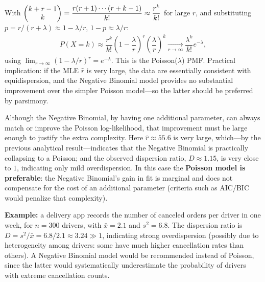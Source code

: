 \begin{solproblema}[prob:8fd9d7f]
	With $\begin{pmatrix} k+r-1 \\ k\end{pmatrix} = \dfrac{r(r+1)\cdots(r+k-1)}{k!} \approx \dfrac{r^k}{k!}$ for large $r$, and substituting $p=r/(r+\lambda)\approx1-\lambda/r$, $1-p\approx\lambda/r$:
	\begin{align*}
		P(X=k) \approx \dfrac{r^k}{k!}\left(1-\dfrac{\lambda}{r}\right)^r\left(\dfrac{\lambda}{r}\right)^k \xrightarrow[r\to\infty]{} \dfrac{\lambda^k}{k!}e^{-\lambda},
	\end{align*}
	using $\lim_{r\to\infty}(1-\lambda/r)^r=e^{-\lambda}$. This is the Poisson($\lambda$) PMF. Practical implication: if the MLE $\hat{r}$ is very large, the data are essentially consistent with equidispersion, and the Negative Binomial model provides no substantial improvement over the simpler Poisson model---so the latter should be preferred by parsimony.
\end{solproblema}

\begin{solproblema}[prob:395bc31]
	Although the Negative Binomial, by having one additional parameter, can always match or improve the Poisson log-likelihood, that improvement must be large enough to justify the extra complexity. Here $\hat{r}\approx55.6$ is very large, which---by the previous analytical result---indicates that the Negative Binomial is practically collapsing to a Poisson; and the observed dispersion ratio, $D\approx1.15$, is very close to $1$, indicating only mild overdispersion. In this case the \textbf{Poisson model is preferable}: the Negative Binomial's gain in fit is marginal and does not compensate for the cost of an additional parameter (criteria such as AIC/BIC would penalize that complexity).
\end{solproblema}

\begin{solproblema}[prob:a28b8e6]
	\textbf{Example:} a delivery app records the number of canceled orders per driver in one week, for $n=300$ drivers, with $\bar{x}=2.1$ and $s^2=6.8$. The dispersion ratio is $D=s^2/\bar{x}=6.8/2.1\approx3.24\gg1$, indicating strong overdispersion (possibly due to heterogeneity among drivers: some have much higher cancellation rates than others). A Negative Binomial model would be recommended instead of Poisson, since the latter would systematically underestimate the probability of drivers with extreme cancellation counts.
\end{solproblema}

